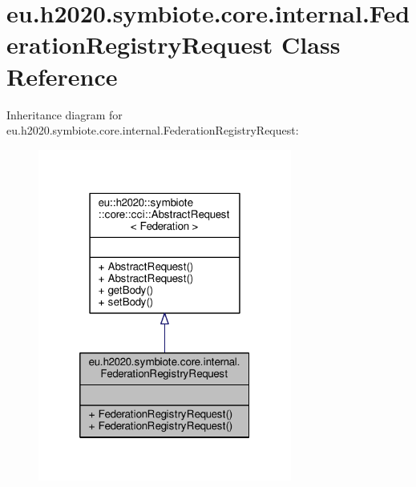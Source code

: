 \hypertarget{classeu_1_1h2020_1_1symbiote_1_1core_1_1internal_1_1FederationRegistryRequest}{}\section{eu.\+h2020.\+symbiote.\+core.\+internal.\+Federation\+Registry\+Request Class Reference}
\label{classeu_1_1h2020_1_1symbiote_1_1core_1_1internal_1_1FederationRegistryRequest}


Inheritance diagram for eu.\+h2020.\+symbiote.\+core.\+internal.\+Federation\+Registry\+Request\+:\nopagebreak
\begin{figure}[H]
\begin{center}
\leavevmode
\includegraphics[width=236pt]{classeu_1_1h2020_1_1symbiote_1_1core_1_1internal_1_1FederationRegistryRequest__inherit__graph}
\end{center}
\end{figure}


